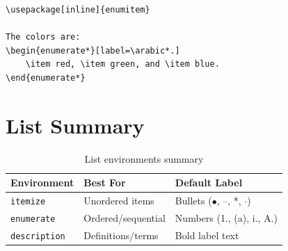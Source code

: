 \begin{lstlisting}[language={[LaTeX]TeX}, caption=Inline list with enumitem]
\usepackage[inline]{enumitem}

The colors are:
\begin{enumerate*}[label=\arabic*.]
    \item red, \item green, and \item blue.
\end{enumerate*}
\end{lstlisting}


\section{List Summary}

\begin{table}[H]
\centering
\begin{tabular}{llp{6cm}}
\toprule
\textbf{Environment} & \textbf{Best For} & \textbf{Default Label} \\
\midrule
\texttt{itemize}    & Unordered items     & Bullets ($\bullet$, --, *, $\cdot$) \\
\texttt{enumerate}  & Ordered/sequential  & Numbers (1., (a), i., A.) \\
\texttt{description}& Definitions/terms   & Bold label text \\
\bottomrule
\end{tabular}
\caption{List environments summary}
\end{table}
